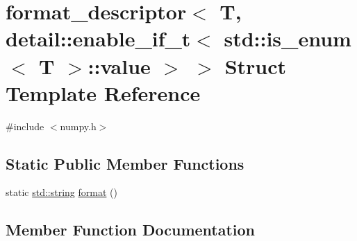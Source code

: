 \hypertarget{structformat__descriptor_3_01_t_00_01detail_1_1enable__if__t_3_01std_1_1is__enum_3_01_t_01_4_1_1value_01_4_01_4}{}\section{format\+\_\+descriptor$<$ T, detail\+::enable\+\_\+if\+\_\+t$<$ std\+::is\+\_\+enum$<$ T $>$\+::value $>$ $>$ Struct Template Reference}
\label{structformat__descriptor_3_01_t_00_01detail_1_1enable__if__t_3_01std_1_1is__enum_3_01_t_01_4_1_1value_01_4_01_4}


{\ttfamily \#include $<$numpy.\+h$>$}

\subsection*{Static Public Member Functions}
\begin{DoxyCompactItemize}
\item 
static \mbox{\hyperlink{_s_d_l__opengl__glext_8h_ab4ccfaa8ab0e1afaae94dc96ef52dde1}{std\+::string}} \mbox{\hyperlink{structformat__descriptor_3_01_t_00_01detail_1_1enable__if__t_3_01std_1_1is__enum_3_01_t_01_4_1_1value_01_4_01_4_a918aee58e242e820d297278fbf62a209}{format}} ()
\end{DoxyCompactItemize}


\subsection{Member Function Documentation}
\mbox{\label{structformat__descriptor_3_01_t_00_01detail_1_1enable__if__t_3_01std_1_1is__enum_3_01_t_01_4_1_1value_01_4_01_4_a918aee58e242e820d297278fbf62a209}} 
